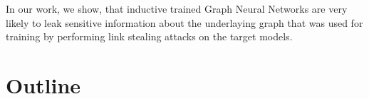		In our work, we show, that inductive trained Graph Neural Networks are very likely to leak sensitive information about the underlaying graph that was used for training by performing link stealing attacks on the target models.

	\section{Outline}
